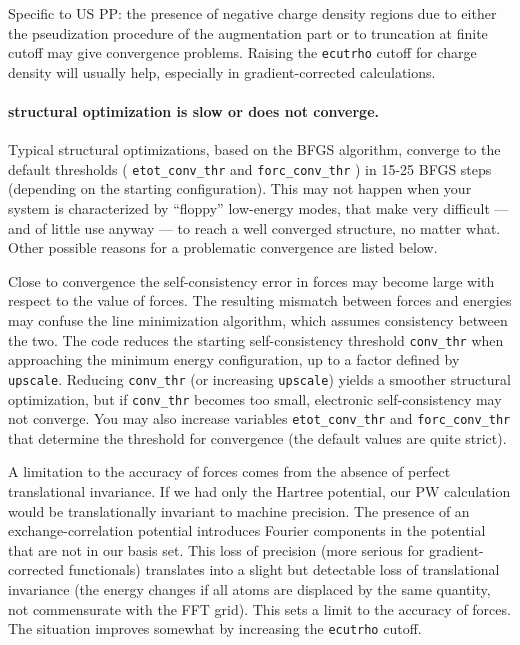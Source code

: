 \documentclass[12pt,a4paper]{article}
\begin{document}
Specific to US PP: the presence of negative charge density regions due
to either the pseudization procedure of the augmentation part or to
truncation at finite cutoff may give convergence problems.
Raising the \texttt{ecutrho} cutoff for charge density will usually
help, especially in gradient-corrected calculations.

\paragraph{structural optimization is slow or does not converge.}

Typical structural optimizations, based on the BFGS algorithm, converge to 
the default thresholds ( \texttt{etot\_conv\_thr} and 
\texttt{forc\_conv\_thr} ) in 15-25 BFGS steps (depending on the starting 
configuration). This may not happen when your system is characterized by 
``floppy'' low-energy modes, that make very difficult --- and of little use 
anyway --- to reach a well converged structure, no matter what.  Other 
possible reasons for a problematic convergence are listed below.

Close to convergence the self-consistency error in forces may become
large with respect to the value of forces.  The resulting mismatch
between forces and energies may confuse the line minimization
algorithm, which assumes consistency between the two.  The code
reduces the starting self-consistency threshold
\texttt{conv\_thr} when approaching the minimum energy configuration,
up to a factor defined by \texttt{upscale}.  Reducing
\texttt{conv\_thr} (or increasing \texttt{upscale}) yields a smoother
structural optimization, but if \texttt{conv\_thr} becomes too small,
electronic self-consistency may not converge.  You may also increase
variables \texttt{etot\_conv\_thr} and
\texttt{forc\_conv\_thr} that determine the threshold for convergence
(the default values are quite strict).

A limitation to the accuracy of forces comes from the absence of
perfect translational invariance.  If we had only the Hartree
potential, our PW calculation would be translationally invariant to
machine precision.  The presence of an exchange-correlation potential
introduces Fourier components in the potential that are not in our
basis set.  This loss of precision (more serious for
gradient-corrected functionals) translates into a slight but
detectable loss of translational invariance (the energy changes if all
atoms are displaced by the same quantity, not commensurate with the
FFT grid).  This sets a limit to the accuracy of forces.  The
situation improves somewhat by increasing the \texttt{ecutrho} cutoff.
\end{document}
